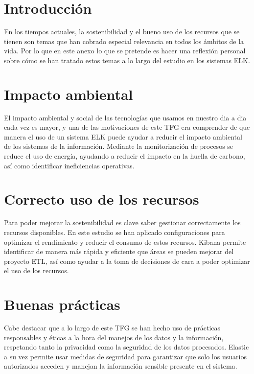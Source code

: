 
\section{Introducción}
En los tiempos actuales, la sostenibilidad y el bueno uso de los recursos que se tienen son temas que han cobrado especial relevancia en todos los ámbitos de la vida. Por lo que en este anexo lo que se pretende es hacer una reflexión personal sobre cómo se han tratado estos temas a lo largo del estudio en los sistemas ELK.

\section{Impacto ambiental}
El impacto ambiental y social de las tecnologías que usamos en nuestro dia a dia cada vez es mayor, y una de las motivaciones de este TFG era comprender de que manera el uso de un sistema ELK puede ayudar a reducir el impacto ambiental de los sistemas de la información. Mediante la monitorización de procesos se reduce el uso de energía, ayudando a reducir el impacto en la huella de carbono, así como identificar ineficiencias operativas.

\section{Correcto uso de los recursos}
Para poder mejorar la sostenibilidad es clave saber gestionar correctamente los recursos disponibles. En este estudio se han aplicado configuraciones para optimizar el rendimiento y reducir el consumo de estos recursos. Kibana permite identificar de manera más rápida y eficiente que áreas se pueden mejorar del proyecto ETL, así como ayudar a la toma de decisiones de cara a poder optimizar el uso de los recursos.

\section{Buenas prácticas}
Cabe destacar que a lo largo de este TFG se han hecho uso de prácticas responsables y éticas a la hora del manejos de los datos y la información, respetando tanto la privacidad como la seguridad de los datos procesados. Elastic a su vez permite usar medidas de seguridad para garantizar que solo los usuarios autorizados acceden y manejan la información sensible presente en el sistema.
